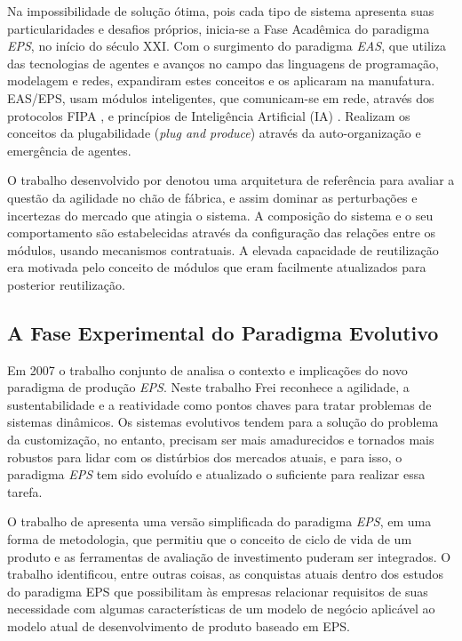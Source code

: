 Na impossibilidade de solução ótima, pois cada tipo de sistema apresenta suas particularidades e desafios próprios, inicia-se a Fase Acadêmica do paradigma \textit{EPS}, no início do século XXI. Com o surgimento do paradigma \textit{EAS}, que utiliza das tecnologias de agentes e avanços no campo das linguagens de programação, modelagem e redes, \cite{ONORI2002} expandiram estes conceitos e os aplicaram na manufatura. EAS/EPS, usam módulos inteligentes, que comunicam-se em rede, através dos protocolos FIPA \cite{FIPA2013}, e princípios de Inteligência Artificial (IA) \cite{Russell_Norvig1995}. Realizam os conceitos da plugabilidade (\textit{plug and produce}) através da auto-organização e emergência de agentes.

O trabalho desenvolvido por \cite{BARATA2003} denotou uma arquitetura de referência para avaliar a questão da agilidade no chão de fábrica, e assim dominar as perturbações e incertezas do mercado que atingia o sistema. A composição do sistema e o seu comportamento são estabelecidas através da configuração das relações entre os módulos, usando mecanismos contratuais. A elevada capacidade de reutilização era motivada pelo conceito de módulos que eram facilmente atualizados para posterior reutilização. 





\subsection{A Fase Experimental do Paradigma Evolutivo}

Em 2007 o trabalho conjunto de \cite{FREI2007} analisa o contexto e implicações do novo paradigma de produção \textit{EPS}.  Neste trabalho Frei reconhece a agilidade, a sustentabilidade e a reatividade como pontos chaves para tratar problemas de sistemas dinâmicos. Os sistemas evolutivos tendem para a solução do problema da customização, no entanto, precisam ser mais amadurecidos e tornados mais robustos para lidar com os distúrbios dos mercados atuais, e para isso, o paradigma \textit{EPS} tem sido evoluído e atualizado o suficiente para realizar essa tarefa.

O trabalho de \cite{MAFFEI2009} apresenta uma versão simplificada do paradigma \textit{EPS}, em uma forma de metodologia, que permitiu que o conceito de ciclo de vida de um produto e as ferramentas de avaliação de investimento puderam ser integrados. O trabalho identificou, entre outras coisas, as conquistas atuais dentro dos estudos do paradigma EPS que possibilitam às empresas relacionar requisitos de suas necessidade com algumas características de um modelo de negócio aplicável ao modelo atual de desenvolvimento de produto baseado em EPS.

